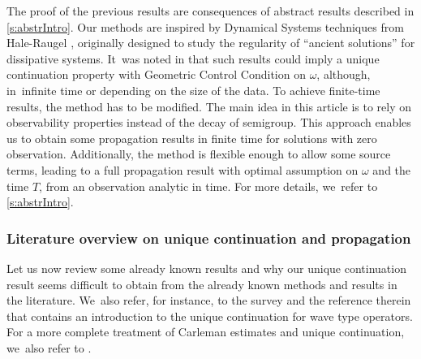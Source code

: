 \documentclass[JEP,XML,SOM,Unicode,published]{cedram}
\theoremstyle{definition}
\begin{document}
The proof of the previous results are consequences of abstract results described in \cref{s:abstrIntro}. Our methods are inspired by Dynamical Systems techniques from Hale-Raugel \cite{HR03}, originally designed to study the regularity of ``ancient solutions'' for dissipative systems. It~was noted in \cite{JL13} that such results could imply a unique continuation property with Geometric Control Condition on $\omega$, although, in~infinite time or depending on the size of the data. To achieve finite-time results, the method has to be modified. The main idea in this article is to rely on observability properties instead of the decay of semigroup. This approach enables us to obtain some propagation results in finite time for solutions with zero observation. Additionally, the method is flexible enough to allow some source terms, leading to a full propagation result with optimal assumption on $\omega$ and the time $T$, from an observation analytic in time. For more details, we~refer to \cref{s:abstrIntro}.
\subsubsection*{Literature overview on unique continuation and propagation} Let us now review some already known results and why our unique continuation result seems difficult to obtain from the already known methods and results in the literature. We~also refer, for instance, to the survey \cite{LL:23Lecture} and the reference therein that contains an introduction to the unique continuation for wave type operators. For a more complete treatment of Carleman estimates and unique continuation, we~also refer to \cite{LernerBook19}.
\end{document}
